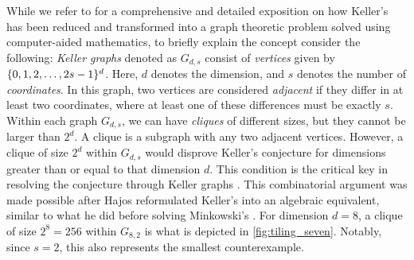 \documentclass[../thesis.tex]{subfiles}
\begin{document}
While we refer to \cite{brakensiekResolutionKellerConjecture2020} for a comprehensive and detailed exposition on how Keller's  has been reduced and transformed into a graph theoretic problem solved using computer-aided mathematics, to briefly explain the concept consider the following: \emph{Keller graphs} denoted as $G_{d,s}$ consist of \emph{vertices} given by $\{0,1,2,\dots,2s-1\}^d$. Here, $d$ denotes the dimension, and $s$ denotes the number of \emph{coordinates}. In this graph, two vertices are considered \emph{adjacent} if they differ in at least two coordinates, where at least one of these differences must be exactly $s$. Within each graph $G_{d,s}$, we can have \emph{cliques} of different sizes, but they cannot be larger than $2^d$. A clique is a subgraph with any two adjacent vertices. However, a clique of size $2^d$ within $G_{d,s}$ would disprove Keller's conjecture for dimensions greater than or equal to that dimension $d$. This condition is the critical key in resolving the conjecture through Keller graphs \cite{corradiCombinatorialApproachKeller1990}. This combinatorial argument was made possible after Hajos reformulated Keller's  into an algebraic equivalent, similar to what he did before solving Minkowski's  \cite{lagariasKellerCubetilingConjecture1992,hajosUeberEinfacheUnd1942}. For dimension $d=8$, a clique of size $2^8=256$ within $G_{8,2}$ is what is depicted in \cref{fig:tiling_seven}. Notably, since $s=2$, this also represents the smallest counterexample. %
\end{document}
